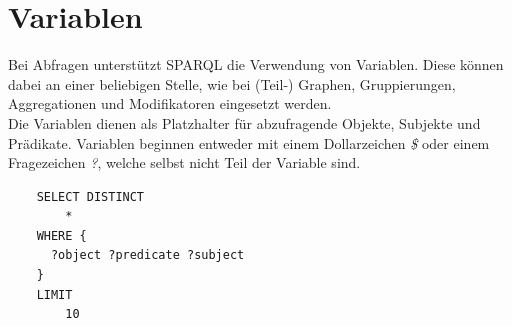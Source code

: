 \section{Variablen}
\label{sec:sparql_variablen}
Bei Abfragen unterstützt SPARQL die Verwendung von Variablen. Diese können dabei an einer beliebigen Stelle, wie bei (Teil-) Graphen, Gruppierungen, Aggregationen und Modifikatoren eingesetzt werden.\\
Die Variablen dienen als Platzhalter für abzufragende Objekte, Subjekte und Prädikate. Variablen beginnen entweder mit einem Dollarzeichen \textit{\$} oder einem Fragezeichen \textit{?}, welche selbst nicht Teil der Variable sind.

\begin{lstlisting}
    SELECT DISTINCT
        *
    WHERE {
      ?object ?predicate ?subject
    }
    LIMIT
        10
\end{lstlisting}

